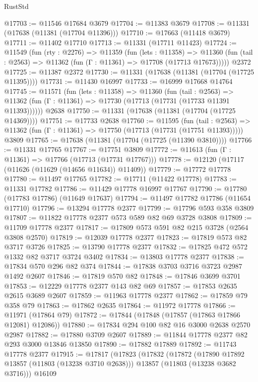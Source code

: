 \begin{lexlean}{RustStd}
\begin{coremodule}
@17703 := @11546 @17684 @3679
@17704 := @11383 @3679
@17708 := @11331 (@17638 (@11381 (@17704 @11396)))
@17710 := @17663 (@11418 @3679)
@17711 := @11402 @17710
@17713 := @11331 (@17711 @11423)
@17724 := @11549
    (fun (rty : @2276) =>
    @11359
      (fun (lets : @11358) =>
      @11360 (fun (tail : @2563) => @11362 (fun (Γ : @11361) => @17708 (@17713 @17673)))))
    @2372
@17725 := @11387 @2372
@17730 := @11331 (@17638 (@11381 (@17704 (@17725 @11395))))
@17731 := @11430 @16997
@17733 := @16999 @17668 @14764
@17745 := @11571
    (fun (lets : @11358) =>
    @11360
      (fun (tail : @2563) =>
      @11362 (fun (Γ : @11361) => @17730 (@17713 (@17731 (@17733 @11391 @11393))))))
    @2638
@17750 := @11331 (@17638 (@11381 (@17704 (@17725 @14369))))
@17751 := @17733 @2638
@17760 := @11595
    (fun (tail : @2563) => @11362 (fun (Γ : @11361) => @17750 (@17713 (@17731 (@17751 @11393)))))
    @3809
@17765 := @17638 (@11381 (@17704 (@17725 (@11390 @3810))))
@17766 := @11331 @17765
@17767 := @17751 @3809
@17772 := @11613 (fun (Γ : @11361) => @17766 (@17713 (@17731 @17767)))
@17778 := @12120 (@17117 (@11626 (@11629 (@14656 @11634)) @11409))
@17779 := @17772 @17778
@17780 := @11497 @17765
@17782 := @17711 (@11422 @17778)
@17783 := @11331 @17782
@17786 := @11429 @17778 @16997 @17767
@17790 := @17780 (@17783 @17786) (@11649 @17637)
@17794 := @11497 @17782 @17786 (@11654 @17710)
@17796 := @13294 @17778 @2377
@17799 := @17796 @593 @358 @3809
@17807 := @11822 @17778 @2377 @573 @589 @82 @69 @3728 @3808
@17809 := @11709 @17778 @2377
@17817 := @17809 @573 @591 @82 @215 @3728 (@2564 @3808 @2570)
@17819 := @12039 @17778 @2377
@17823 := @17819 @573 @82 @3717 @3726
@17825 := @13790 @17778 @2377
@17832 := @17825 @472 @572 @1332 @82 @3717 @3724 @3402
@17834 := @13803 @17778 @2377
@17838 := @17834 @570 @296 @82 @374
@17844 := @17838 @3703 @3716 @3723 @2987 @1492 @2607
@17846 := @17819 @570 @82
@17848 := @17846 @3699 @3701
@17853 := @12229 @17778 @2377 @143 @82 @69
@17857 := @17853 @2635 @2615 @3689 @2607
@17859 := @11963 @17778 @2377
@17862 := @17859 @79 @358 @79
@17863 := @17862 @2635
@17864 := @11972 @17778
@17866 := @11971 (@17864 @79)
@17872 := @17844 (@17848 (@17857 (@17863 @17866 @12081) @12086))
@17880 := @17834 @294 @100 @82 @16 @3000 @2638 @2570 @2987
@17882 := @17880 @3709 @2607
@17889 := @11844 @17778 @2377 @82 @293 @3000 @13846 @13850
@17890 := @17882 @17889
@17892 := @11743 @17778 @2377
@17915 := @17817
    (@17823
      (@17832
        (@17872
          (@17890 @17892 @13857 (@11803 (@13238 @3710 @2638)))
          @13857
          (@11803 (@13238 @3682 @3716)))
        @16109

\end{coremodule}
\end{lexlean}
